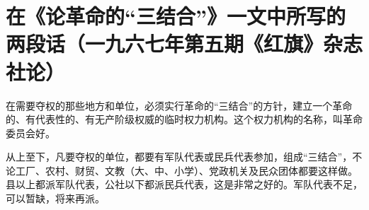 \section[在《论革命的“三结合”》一文中所写的两段话（一九六七年第五期《红旗》杂志社论）]{在《论革命的“三结合”》一文中所写的两段话（一九六七年第五期《红旗》杂志社论）}


在需要夺权的那些地方和单位，必须实行革命的“三结合”的方针，建立一个革命的、有代表性的、有无产阶级权威的临时权力机构。这个权力机构的名称，叫革命委员会好。

从上至下，凡要夺权的单位，都要有军队代表或民兵代表参加，组成“三结合”，不论工厂、农村、财贸、文教（大、中、小学）、党政机关及民众团体都要这样做。县以上都派军队代表，公社以下都派民兵代表，这是非常之好的。军队代表不足，可以暂缺，将来再派。


